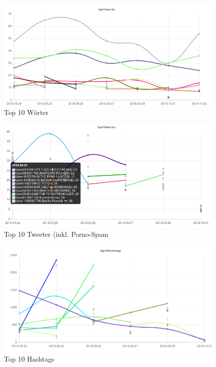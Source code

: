 \begin{figure}
\centering
\includegraphics[width=\textwidth]{bilder/BilderAnalyse-img4.png}
\caption{Top 10 Wörter}
\end{figure}
\begin{figure}
\centering
\includegraphics[width=\textwidth]{bilder/BilderAnalyse-img5.png}
\caption{Top 10 Tweeter (inkl. Porno-Spam}
\end{figure}
\begin{figure}
\centering
\includegraphics[width=\textwidth]{bilder/BilderAnalyse-img6.png}
\caption{Top 10 Hashtags}
\end{figure}
